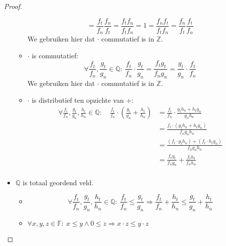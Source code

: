 \documentclass[main.tex]{subfiles}
\begin{document}
\begin{pr}
\begin{proof}
\begin{itemize}
\begin{itemize}
\[        = \frac{f_{t}}{f_{n}}\frac{f_{n}}{f_{t}}
        = \frac{f_{t}f_{n}}{f_{t}f_{n}}
        = 1
        = \frac{f_{n}f_{t}}{f_{t}f_{n}}
        = \frac{f_{n}}{f_{t}}\frac{f_{t}}{f_{n}}
        \]
        We gebruiken hier dat $\cdot$ commutatief is in $\mathbb{Z}$.
      \item $\cdot$ is commutatief:
        \[
        \forall \frac{f_{t}}{f_{n}},\frac{g_{t}}{g_{n}} \in \mathbb{Q}:\
        \frac{f_{t}}{f_{n}} \cdot \frac{g_{t}}{g_{n}}
        = \frac{f_{t}g_{t}}{f_{n}g_{n}}
        = \frac{g_{t}}{g_{n}} \cdot \frac{f_{t}}{f_{n}}
        \]
        We gebruiken hier dat $\cdot$ commutatief is in $\mathbb{Z}$.
      \item $\cdot$ is distributief ten opzichte van $+$:
        \[
        \begin{array}{rrl}
          \forall \frac{f_{t}}{f_{n}},\frac{g_{t}}{g_{n}},\frac{h_{t}}{h_{n}} \in \mathbb{Q}:\ 
          &\frac{f_{t}}{f_{n}} \cdot \left(\frac{g_{t}}{g_{n}} + \frac{h_{t}}{h_{n}} \right)
          &= \frac{f_{t}}{f_{n}} \cdot \frac{g_{t}h_{n}+h_{t}g_{n}}{g_{n}h_{n}}\\
          &&= \frac{f_{t}\cdot (g_{t}h_{n}+h_{t}g_{n})}{f_{n}g_{n}h_{n}}\\
          &&= \frac{(f_{t} \cdot g_{t}h_{n}) + (f_{t}\cdot h_{t}g_{n})}{f_{n}g_{n}h_{n}}\\
          &&= \frac{f_{t}g_{t}}{f_{n}g_{n}} + \frac{f_{t}h_{t}}{f_{n}h_{n}}\\
        \end{array}
        \]
      \end{itemize}
    \item $\mathbb{Q}$ is totaal geordend veld.
      \begin{itemize}
      \item
        \[
        \forall \frac{f_{t}}{f_{n}},\frac{g_{t}}{g_{n}},\frac{h_{t}}{h_{n}} \in \mathbb{Q}:\ 
        \frac{f_{t}}{f_{n}} \le \frac{g_{t}}{g_{n}}
        \Rightarrow
        \frac{f_{t}}{f_{n}}+\frac{h_{t}}{h_{n}} \le \frac{g_{t}}{g_{n}}+\frac{h_{t}}{h_{n}}
        \]
      \item $\forall x,y,z \in \mathbb{F}:\ x \le y \wedge 0 \le z \Rightarrow x\cdot z \le y\cdot z$
      \end{itemize}
    \end{itemize}
  \end{proof}
\end{pr}
\end{document}
